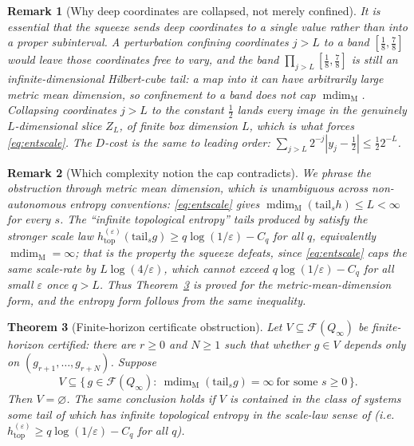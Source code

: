 \documentclass[11pt]{article}
\newtheorem{theorem}{Theorem}[section]
\newtheorem{remark}[theorem]{Remark}
\newcommand{\Q}{Q_\infty}
\newcommand{\F}{\mathcal{F}}
\newcommand{\mdim}{\operatorname{mdim}_{\mathrm M}}
\begin{document}
\begin{remark}[Why deep coordinates are collapsed, not merely confined]\label{rem:collapse}
It is essential that the squeeze sends deep coordinates to a single value rather than
into a proper subinterval.  A perturbation confining coordinates $j>L$ to a band
$[\frac18,\frac78]$ would leave those coordinates free to vary, and the band
$\prod_{j>L}[\frac18,\frac78]$ is still an infinite-dimensional Hilbert-cube tail: a map
into it can have arbitrarily large metric mean dimension, so confinement to a band does
\emph{not} cap $\mdim$.  Collapsing coordinates $j>L$ to the constant $\frac12$ lands
every image in the genuinely $L$-dimensional slice $Z_L$, of finite box dimension $L$,
which is what forces \eqref{eq:entscale}.  The $D$-cost is the same to leading order:
$\sum_{j>L}2^{-j}|y_j-\frac12|\le\frac12 2^{-L}$.
\end{remark}

\begin{remark}[Which complexity notion the cap contradicts]\label{rem:notion}
We phrase the obstruction through metric mean dimension, which is unambiguous across
non-autonomous entropy conventions: \eqref{eq:entscale} gives
$\mdim(\mathrm{tail}_sh)\le L<\infty$ for every $s$.  The ``infinite topological
entropy'' tails produced by \cite{Shmalo2026} satisfy the stronger scale law
$h^{(\varepsilon)}_{\mathrm{top}}(\mathrm{tail}_sg)\ge q\log(1/\varepsilon)-C_q$ for all
$q$, equivalently $\mdim=\infty$; that is the property the squeeze defeats, since
\eqref{eq:entscale} caps the same scale-rate by \(L\log(4/\varepsilon)\), which cannot
exceed $q\log(1/\varepsilon)-C_q$ for all small $\varepsilon$ once $q>L$.  Thus
Theorem~\ref{thm:obstruction} is proved for the metric-mean-dimension form, and the
entropy form follows from the same inequality.
\end{remark}

\begin{theorem}[Finite-horizon certificate obstruction]\label{thm:obstruction}
Let $V\subseteq\F(\Q)$ be finite-horizon certified: there are $r\ge0$ and $N\ge1$ such
that whether $g\in V$ depends only on $(g_{r+1},\dots,g_{r+N})$.  Suppose
\[
V\subseteq\bigl\{\,g\in\F(\Q):\ \mdim(\mathrm{tail}_sg)=\infty\ \text{for some }s\ge0\,\bigr\}.
\]
Then $V=\varnothing$.  The same conclusion holds if $V$ is contained in the class of
systems some tail of which has infinite topological entropy in the scale-law sense of
\cite{Shmalo2026} (i.e.\ $h^{(\varepsilon)}_{\mathrm{top}}\ge q\log(1/\varepsilon)-C_q$
for all $q$).
\end{theorem}
\end{document}
